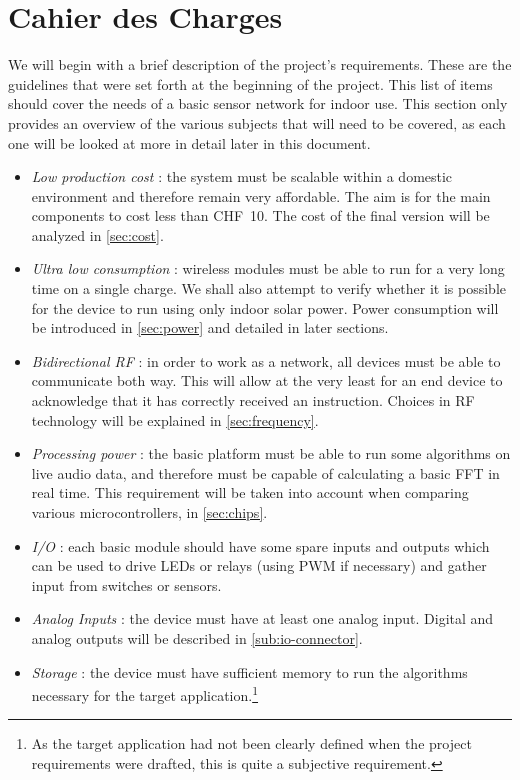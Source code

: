 \section{Cahier des Charges}\label{sec:cdc}

We will begin with a brief description of the project's requirements. These are
the guidelines that were set forth at the beginning of the project. This list of
items should cover the needs of a basic sensor network for indoor use. This
section only provides an overview of the various subjects that will need to be
covered, as each one will be looked at more in detail later in this document.

\begin{itemize}
  \item \emph{Low production cost} :
    the system must be scalable within
    a domestic environment and therefore remain very affordable. The aim is for
    the main components to cost less than CHF~10. The cost of the final version
    will be analyzed in \autoref{sec:cost}.
  \item \emph{Ultra low consumption} :
    wireless modules must be able to run for a very long time on a single
    charge. We shall also attempt to verify whether it is possible for the
    device to run using only indoor solar power.  Power consumption will be
    introduced in \autoref{sec:power} and detailed in later sections.
  \item \emph{Bidirectional RF} : 
    in order to work as a network, all devices must be able to communicate both
    way. This will allow at the very least for an end device to acknowledge
    that it has correctly received an instruction.
    Choices in RF technology will be explained in \autoref{sec:frequency}.
  \item \emph{Processing power} :
    the basic platform must be able to run some algorithms on live audio data,
    and therefore must be capable of calculating a basic \ac{FFT} in real time.
    This requirement will be taken into account when comparing various
    microcontrollers, in \autoref{sec:chips}.
  \item \emph{I/O} :
    each basic module should have some spare inputs and outputs which can be
    used to drive LEDs or relays (using \ac{PWM} if necessary) and gather input
    from switches or sensors.
  \item \emph{Analog Inputs} :
    the device must have at least one analog input. Digital and analog outputs
    will be described in \autoref{sub:io-connector}.
  \item \emph{Storage} :
    the device must have sufficient memory to run the algorithms necessary for
    the target application.\footnote{As the target application had not been
    clearly defined when the project requirements were drafted, this is quite
    a subjective requirement.}
\end{itemize}

